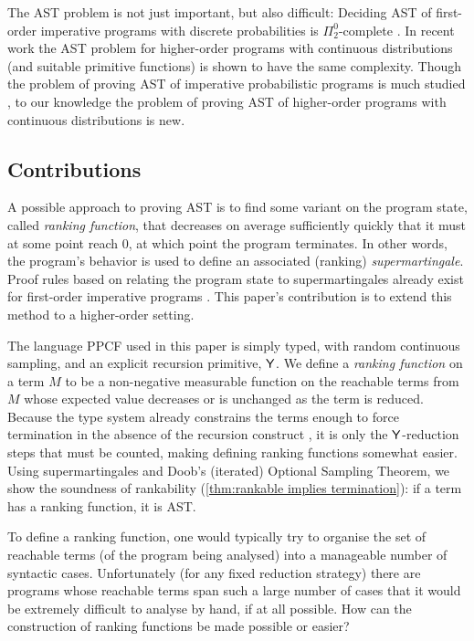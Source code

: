 The AST problem is not just important, but also difficult: 
Deciding AST of first-order imperative programs with discrete probabilities is $\Pi^0_2$-complete \cite{DBLP:conf/mfcs/KaminskiK15}.
In recent work \cite{BeutnerO21} %
the AST problem for higher-order programs with continuous distributions (and suitable primitive functions) is shown to have the same complexity.
Though the problem of proving AST of imperative probabilistic programs is much studied \cite{DBLP:journals/jacm/KaminskiKMO18,DBLP:conf/lics/OlmedoKKM16,DBLP:conf/mfcs/KaminskiK15,DBLP:series/mcs/McIverM05,DBLP:conf/popl/FioritiH15,DBLP:conf/pldi/ChenH20,DBLP:journals/toplas/ChatterjeeFNH18}, to our knowledge the problem of proving AST of higher-order programs with continuous distributions is new.

\subsection*{Contributions}

A possible approach to proving AST is to find some variant on the program state, called \emph{ranking function}, that decreases on average sufficiently quickly that it must at some point reach 0, at which point the program terminates. 
In other words, the program's behavior is used to define an associated (ranking) \emph{supermartingale}. Proof rules based on relating the program state to supermartingales already exist for first-order imperative programs \cite{DBLP:conf/cav/ChakarovS13,DBLP:conf/popl/FioritiH15,DBLP:journals/pacmpl/McIverMKK18}. This paper's contribution is to extend this method to a higher-order setting.

The language PPCF used in this paper is simply typed, with random continuous sampling, and an explicit recursion primitive, $\mathsf{Y}$. 
We define a \emph{ranking function} on a term $M$ to be a non-negative measurable function on the reachable terms from $M$ whose expected value decreases or is unchanged as the term is reduced.
Because the type system already constrains the terms enough to force termination in the absence of the recursion construct \cite{tait1967,BarendregtDS2010}, it is only the $\mathsf{Y}$-reduction steps that must be counted, making defining ranking functions somewhat easier.
Using supermartingales and Doob's (iterated) Optional Sampling Theorem, we show the soundness of rankability (\cref{thm:rankable implies termination}): if a term has a ranking function, it is AST.

To define a ranking function, one would typically try to organise the set of reachable terms (of the program being analysed) into a manageable number of syntactic cases. 
Unfortunately (for any fixed reduction strategy) there are programs whose reachable terms span such a large number of cases that it would be extremely difficult to analyse by hand, if at all possible. 
How can the construction of ranking functions be made possible or easier?

